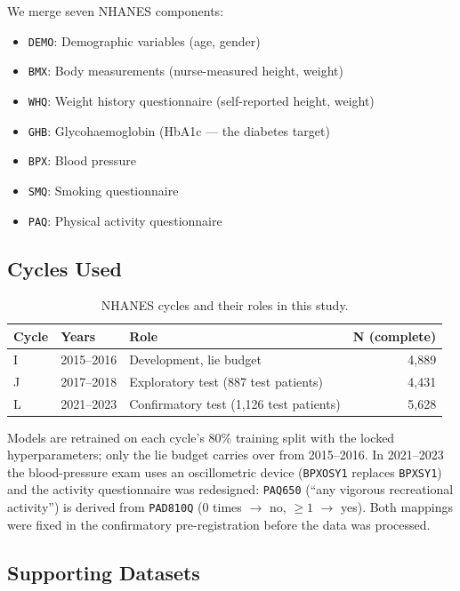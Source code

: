 \documentclass[12pt, a4paper, oneside]{report}
\theoremstyle{definition}
\begin{document}
We merge seven NHANES components:
\begin{itemize}
  \item \texttt{DEMO}: Demographic variables (age, gender)
  \item \texttt{BMX}: Body measurements (nurse-measured height, weight)
  \item \texttt{WHQ}: Weight history questionnaire (self-reported height, weight)
  \item \texttt{GHB}: Glycohaemoglobin (HbA1c --- the diabetes target)
  \item \texttt{BPX}: Blood pressure
  \item \texttt{SMQ}: Smoking questionnaire
  \item \texttt{PAQ}: Physical activity questionnaire
\end{itemize}

\subsection{Cycles Used}

\begin{table}[htbp]
  \centering
  \caption{NHANES cycles and their roles in this study.}
  \label{tab:cycles}
  \begin{tabular}{lllr}
    \toprule
    Cycle & Years & Role & N (complete) \\
    \midrule
    I  & 2015--2016 & Development, lie budget & 4,889 \\
    J  & 2017--2018 & Exploratory test (887 test patients) & 4,431 \\
    L  & 2021--2023 & Confirmatory test (1,126 test patients) & 5,628 \\
    \bottomrule
  \end{tabular}
\end{table}

Models are retrained on each cycle's 80\% training split with the
locked hyperparameters; only the lie budget carries over from
2015--2016. In 2021--2023 the blood-pressure exam uses an oscillometric
device (\texttt{BPXOSY1} replaces \texttt{BPXSY1}) and the activity
questionnaire was redesigned: \texttt{PAQ650} (``any vigorous
recreational activity'') is derived from \texttt{PAD810Q} (0 times $\to$
no, $\geq 1$ $\to$ yes). Both mappings were fixed in the confirmatory
pre-registration before the data was processed.

\subsection{Supporting Datasets}
\end{document}
